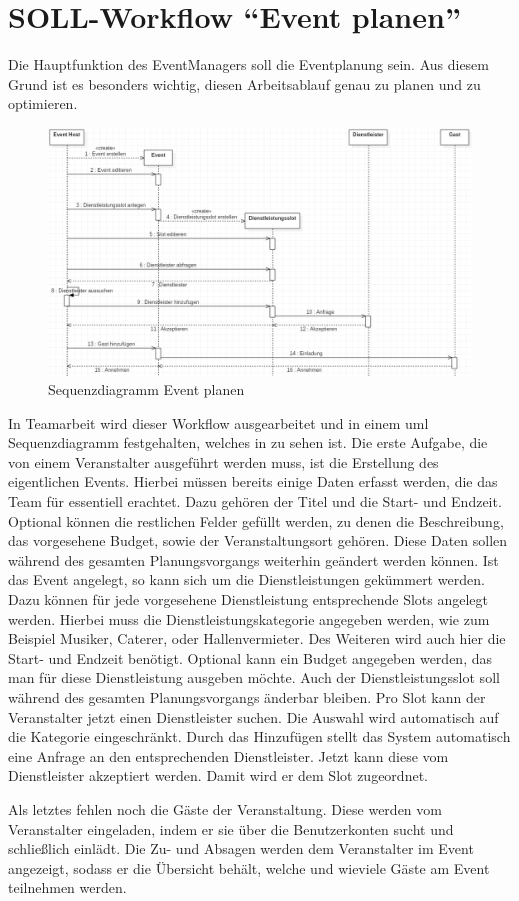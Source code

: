 
\section{SOLL-Workflow \enquote{Event planen}}
\label{workflow}

Die Hauptfunktion des EventManagers soll die Eventplanung sein. Aus diesem Grund ist es besonders wichtig, diesen Arbeitsablauf genau zu planen und zu optimieren.

\begin{figure}[ht]
\centering
\includegraphics[width=\textwidth]{res/images/WorkflowCreateEvent.png}
\caption{Sequenzdiagramm Event planen}
\label{wf1}
\end{figure}

In Teamarbeit wird dieser Workflow ausgearbeitet und in einem \gls{uml} Sequenzdiagramm festgehalten, welches in  zu sehen ist. Die erste Aufgabe, die von einem Veranstalter ausgeführt werden muss, ist die Erstellung des eigentlichen Events. Hierbei müssen bereits einige Daten erfasst werden, die das Team für essentiell erachtet. Dazu gehören der Titel und die Start- und Endzeit. Optional können die restlichen Felder gefüllt werden, zu denen die Beschreibung, das vorgesehene Budget, sowie der Veranstaltungsort gehören. Diese Daten sollen während des gesamten Planungsvorgangs weiterhin geändert werden können. Ist das Event angelegt, so kann sich um die Dienstleistungen gekümmert werden. Dazu können für jede vorgesehene Dienstleistung entsprechende Slots angelegt werden. Hierbei muss die Dienstleistungskategorie angegeben werden, wie zum Beispiel Musiker, Caterer, oder Hallenvermieter. Des Weiteren wird auch hier die Start- und Endzeit benötigt. Optional kann ein Budget angegeben werden, das man für diese Dienstleistung ausgeben möchte. Auch der Dienstleistungsslot soll während des gesamten Planungsvorgangs änderbar bleiben. Pro Slot kann der Veranstalter jetzt einen Dienstleister suchen. Die Auswahl wird automatisch auf die Kategorie eingeschränkt. Durch das Hinzufügen stellt das System automatisch eine Anfrage an den entsprechenden Dienstleister. Jetzt kann diese vom Dienstleister akzeptiert werden. Damit wird er dem Slot zugeordnet.

Als letztes fehlen noch die Gäste der Veranstaltung. Diese werden vom Veranstalter eingeladen, indem er sie über die Benutzerkonten sucht und schließlich einlädt. Die Zu- und Absagen werden dem Veranstalter im Event angezeigt, sodass er die Übersicht behält, welche und wieviele Gäste am Event teilnehmen werden.
